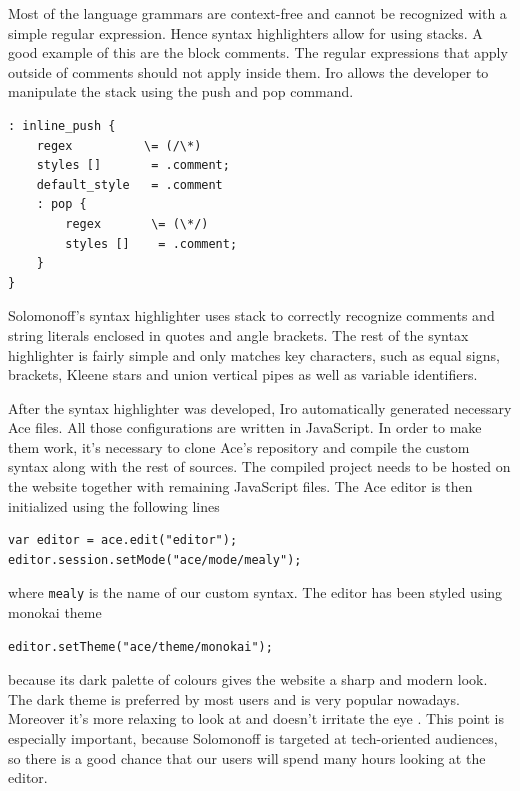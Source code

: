 Most of the language grammars are context-free and cannot be recognized with a simple regular expression. Hence syntax highlighters allow for using stacks. A good example of this are the block comments. The regular expressions that apply outside of comments should not apply inside them. Iro allows the developer to manipulate the stack using the push and pop command.
\begin{lstlisting}
: inline_push {
    regex          \= (/\*)
    styles []       = .comment;
    default_style   = .comment
    : pop {
        regex       \= (\*/)
        styles []    = .comment;
    }
}
\end{lstlisting}
Solomonoff's syntax highlighter uses stack to correctly recognize comments and string literals enclosed in quotes and angle brackets. The rest of the syntax highlighter is fairly simple and only matches key characters, such as equal signs, brackets, Kleene stars and union vertical pipes as well as variable identifiers.

After the syntax highlighter was developed, Iro automatically generated necessary Ace files. All those configurations are written in JavaScript. In order to make them work, it's necessary to clone Ace's repository and compile the custom syntax along with the rest of sources. The compiled project needs to be hosted on the website together with remaining JavaScript files. The Ace editor is then initialized using the following lines
\begin{lstlisting}
var editor = ace.edit("editor");
editor.session.setMode("ace/mode/mealy");
\end{lstlisting}
where     \texttt{mealy} is the name of our custom syntax.
The editor has been styled using monokai theme
\begin{lstlisting}
editor.setTheme("ace/theme/monokai");
\end{lstlisting}
because its dark palette of colours gives the website a sharp and modern look. The dark theme is preferred by most users and is very popular nowadays. Moreover it's more relaxing to look at and doesn't irritate the eye \cite{syntax_highlighter}. This point is especially important, because Solomonoff is targeted at tech-oriented audiences, so there is a good chance that our users will spend many hours looking at the editor. 

